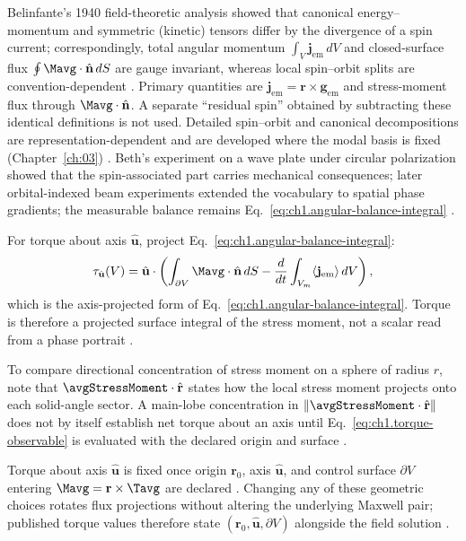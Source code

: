 Belinfante's 1940 field-theoretic analysis \cite{belinfante1940} showed that canonical
energy--momentum and symmetric (kinetic) tensors differ by the divergence of a spin
current; correspondingly, total angular momentum
$\int_V \mathbf{j}_{\mathrm{em}}\,dV$ and closed-surface flux
$\oint \Mavg\cdot\hat{\mathbf{n}}\,dS$ are gauge invariant, whereas local spin--orbit splits are convention-dependent \cite{belinfante1940}. Primary quantities are $\mathbf{j}_{\mathrm{em}}=\mathbf{r}\times\mathbf{g}_{\mathrm{em}}$ and stress-moment flux through $\Mavg\cdot\hat{\mathbf{n}}$. A separate
``residual spin'' obtained by subtracting these identical definitions is not used.
Detailed spin--orbit and canonical decompositions are representation-dependent and are
developed where the modal basis is fixed (Chapter~\ref{ch:03}) \cite{belinfante1940,belinfante1940,tai1994}.
Beth's experiment on a wave plate under circular polarization
\cite{beth1936} showed that the spin-associated part carries mechanical consequences; later orbital-indexed beam experiments
\cite{allen1992} extended the vocabulary to spatial phase gradients; the measurable
balance remains Eq.~\eqref{eq:ch1.angular-balance-integral} \cite{belinfante1940}.

For torque about axis $\hat{\mathbf{u}}$, project Eq.~\eqref{eq:ch1.angular-balance-integral}:
\begin{equation}
\label{eq:ch1.torque-observable}
\tau_{\hat{\mathbf{u}}}(V)
=\hat{\mathbf{u}}\cdot
\left(
\int_{\partial V}\Mavg\cdot\hat{\mathbf{n}}\,dS
-\frac{d}{dt}\int_{V_m} \langle\mathbf{j}_{\mathrm{em}}\rangle\,dV
\right),
\end{equation}
which is the axis-projected form of Eq.~\eqref{eq:ch1.angular-balance-integral}.
Torque is therefore a projected surface integral of the stress moment, not a scalar read from a phase portrait \cite{beth1936,stratton1941}.

To compare directional concentration of stress moment on a sphere of radius $r$, note that $\avgStressMoment\cdot\hat{\mathbf{r}}$ states how the local stress moment projects onto each solid-angle sector. A main-lobe concentration in $\|\avgStressMoment\cdot\hat{\mathbf{r}}\|$ does not by itself establish net torque about an axis until Eq.~\eqref{eq:ch1.torque-observable} is evaluated with the declared origin and surface \cite{stratton1941,beth1936}.
\label{eq:ch1.angular-flux-directional-index}

Torque about axis $\hat{\mathbf{u}}$ is fixed once origin $\mathbf{r}_0$, axis $\hat{\mathbf{u}}$, and control surface $\partial V$ entering $\Mavg=\mathbf{r}\times\Tavg$ are declared \cite{stratton1941}. Changing any of these geometric choices rotates flux projections without altering the underlying Maxwell pair; published torque values therefore state $(\mathbf{r}_0,\hat{\mathbf{u}},\partial V)$ alongside the field solution \cite{beth1936}.

